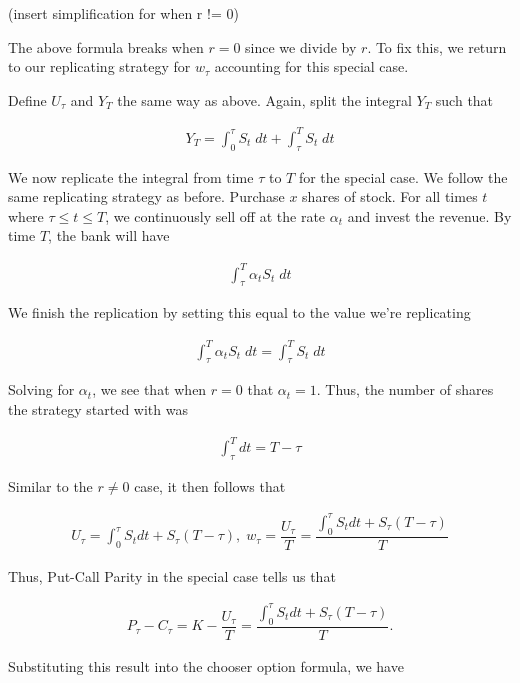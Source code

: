 \documentclass[reqno]{amsart}
\begin{document}
(insert simplification for when r != 0)

The above formula breaks when $r = 0$ since we divide by $r$. To fix this, we return to our replicating strategy for $w_\tau$ accounting for this special case.

Define $U_\tau$ and $Y_T$ the same way as above. Again, split the integral $Y_T$ such that

\begin{align}
     Y_T = \int_0^\tau S_t \; dt + \int_\tau^T S_t \; dt
\end{align}

We now replicate the integral from time $\tau$ to $T$ for the special case. We follow the same replicating strategy as before. Purchase $x$ shares of stock. For all times $t$ where $\tau \leq t \leq T$, we continuously sell off at the rate $\alpha_t$ and invest the revenue. 
By time $T$, the bank will have 

\begin{align}
     \int_\tau^T \alpha_t S_t \; dt
\end{align}

We finish the replication by setting this equal to the value we're replicating

\begin{align}
     \int_\tau^T \alpha_t S_t \; dt = \int_\tau^T S_t \; dt
\end{align}

Solving for $\alpha_t$, we see that when $r = 0$ that $\alpha_t = 1$. Thus, the number of shares the strategy started with was

\begin{align}
     \int_\tau^T dt = T - \tau
\end{align}

Similar to the $r \neq 0$ case, it then follows that

\begin{align}
     U_\tau = \int_0^\tau S_t dt + S_\tau (T - \tau), \; w_\tau = \dfrac{U_\tau}{T} = \dfrac{\int_0^\tau S_t dt + S_\tau (T - \tau)}{T}
\end{align}

Thus, Put-Call Parity in the special case tells us that 

\begin{align}
     P_\tau - C_\tau = K - \dfrac{U_\tau}{T} = \dfrac{\int_0^\tau S_t dt + S_\tau (T - \tau)}{T}.
\end{align}

Substituting this result into the chooser option formula, we have
\end{document}
